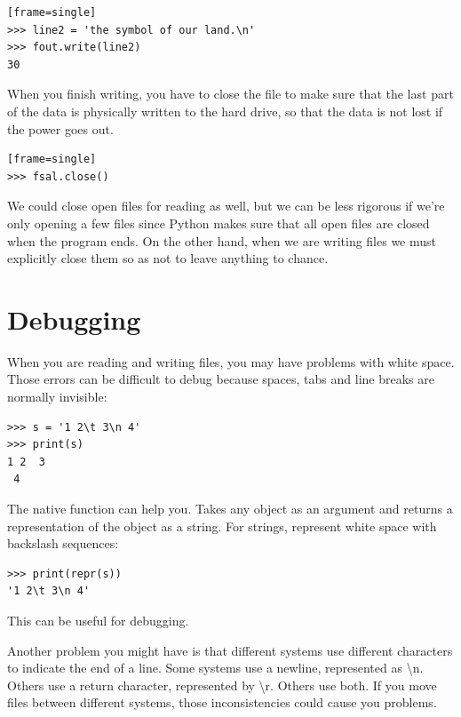 \begin{Verbatim}[frame=single][frame=single]
>>> line2 = 'the symbol of our land.\n'
>>> fout.write(line2)
30
\end{Verbatim}

When you finish writing, you have to close the file to make sure that the last part of the data is physically written to the hard drive, so that the data is not lost if the power goes out.

\begin{Verbatim}[frame=single][frame=single]
>>> fsal.close()
\end{Verbatim}

We could close open files for reading as well, but we can be less rigorous if we're only opening a few files since Python makes sure that all open files are closed when the program ends. On the other hand, when we are writing files we must explicitly close them so as not to leave anything to chance.

 

\hypertarget{depuraciuxf3n}{%
\section{Debugging}\label{depuraciuxf3n}}

 

When you are reading and writing files, you may have problems with white space. Those errors can be difficult to debug because spaces, tabs and line breaks are normally invisible:

\begin{Verbatim}[frame=single]
>>> s = '1 2\t 3\n 4'
>>> print(s)
1 2  3
 4
\end{Verbatim}

  

The native function  can help you. Takes any object as an argument and returns a representation of the object as a string. For strings, represent white space with backslash sequences:

\begin{Verbatim}[frame=single]
>>> print(repr(s))
'1 2\t 3\n 4'
\end{Verbatim}

This can be useful for debugging.

Another problem you might have is that different systems use different characters to indicate the end of a line. Some systems use a newline, represented as \textbackslash{}n. Others use a return character, represented by \textbackslash{}r. Others use both. If you move files between different systems, those inconsistencies could cause you problems.

